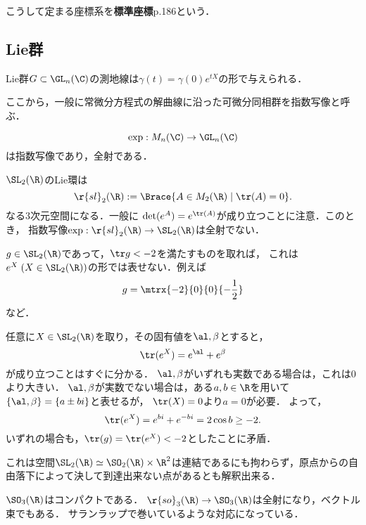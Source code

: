 \documentclass[uplatex,dvipdfmx]{jsreport}
\begin{document}
\begin{definition}
    こうして定まる座標系を\textbf{標準座標}\cite{志賀浩二-多様体}p.186という．
\end{definition}

\subsection{Lie群}

\begin{problem}
    Lie群$G\subset\GL_n(\C)$の測地線は$\gamma(t)=\gamma(0)e^{tX}$の形で与えられる．
\end{problem}
\begin{remarks}
    ここから，一般に常微分方程式の解曲線に沿った可微分同相群を指数写像と呼ぶ．
\end{remarks}

\begin{example}
    \[\exp:M_n(\C)\to\GL_n(\C)\]
    は指数写像であり，全射である．
\end{example}

\begin{problem}
    $\SL_2(\R)$のLie環は
    \[\r{sl}_2(\R):=\Brace{A\in M_2(\R)\mid\tr(A)=0}.\]
    なる3次元空間になる．一般に
    $\det(e^A)=e^{\tr(A)}$が成り立つことに注意．このとき，
    指数写像$\exp:\r{sl}_2(\R)\to\SL_2(\R)$は全射でない．
\end{problem}
\begin{Proof}
    $g\in\SL_2(\R)$であって，$\tr g<-2$を満たすものを取れば，
    これは$e^X\;(X\in \SL_2(\R))$の形では表せない．例えば
    \[g=\mtrx{-2}{0}{0}{-\frac{1}{2}}\]
    など．
    
    任意に$X\in \SL_2(\R)$を取り，その固有値を$\al,\beta$とすると，
    \[\tr(e^X)=e^\al+e^\beta\]
    が成り立つことはすぐに分かる．
    $\al,\beta$がいずれも実数である場合は，これは$0$より大きい．
    $\al,\beta$が実数でない場合は，ある$a,b\in\R$を用いて$\{\al,\beta\}=\{a\pm bi\}$と表せるが，
    $\tr(X)=0$より$a=0$が必要．
    よって，
    \[\tr(e^X)=e^{bi}+e^{-bi}=2\cos b\ge-2.\]
    いずれの場合も，$\tr(g)=\tr(e^X)<-2$としたことに矛盾．
\end{Proof}
\begin{remarks}
    これは空間$\SL_2(\R)\simeq\SO_2(\R)\times\R^2$は連結であるにも拘わらず，原点からの自由落下によって決して到達出来ない点があるとも解釈出来る．
\end{remarks}

\begin{example}
    $\SO_3(\R)$はコンパクトである．
    $\r{so}_3(\R)\to\SO_3(\R)$は全射になり，ベクトル束でもある．
    サランラップで巻いているような対応になっている．
\end{example}
\end{document}
